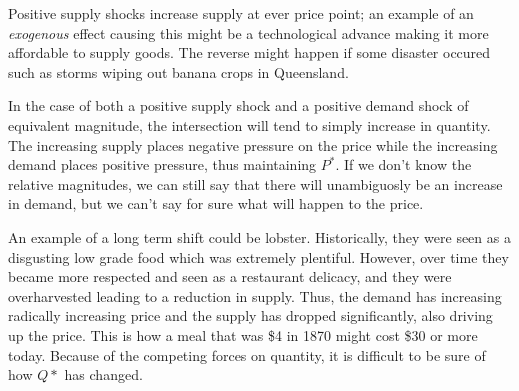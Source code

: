 \documentclass[12pt]{report}
\begin{document}
\bigskip
Positive supply shocks increase supply at ever price point; an example of an \textit{exogenous} effect
causing this might be a technological advance making it more affordable to supply goods. The 
reverse might happen if some disaster occured such as storms wiping out banana crops in Queensland.

\bigskip
In the case of both a positive supply shock and a positive demand shock of equivalent magnitude,
the intersection will tend to simply increase in quantity. The increasing supply places negative pressure on the price while the increasing
demand places positive pressure, thus maintaining \(P^*\). If we don't know the relative magnitudes,
we can still say that there will unambiguosly be an increase in demand, but we can't say for sure
what will happen to the price.

\bigskip
An example of a long term shift could be lobster. Historically, they were seen as a disgusting low
grade food which was extremely plentiful. However, over time they became more respected and seen
 as a restaurant delicacy, and they were overharvested leading to a reduction in supply.
 Thus, the demand has increasing radically increasing price and the supply has dropped significantly,
 also driving up the price. This is how a meal that was \$4 in 1870 might cost \$30 or more today.
Because of the competing forces on quantity, it is difficult to be sure of how \(Q*\) has changed.
\end{document}
